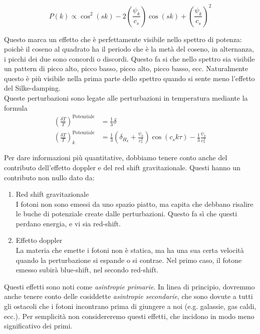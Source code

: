 \documentclass{report}
\begin{document}
\begin{equation}
    P(k) \propto \cos^2(sk) -2\left(\frac{\psi_k}{c_s}\right)\cos(sk) + \left(\frac{\psi_k}{c_s} \right)^2
\end{equation}

Questo marca un effetto che è perfettamente visibile nello spettro di potenza: poichè il coseno al quadrato ha il periodo che è la metà del coseno, in alternanza, i picchi dei due sono concordi o discordi. Questo fa si che nello spettro sia visibile un pattern di picco alto, picco basso, picco alto, picco basso, ecc. Naturalmente questo è più visibile nella prima parte dello spettro quando si sente meno l'effetto del Silke-damping. \\

Queste perturbazioni sono legate alle perturbazioni in temperatura mediante la formula 
\begin{align}
    \left(\frac{\delta T}{T}\right)^{\text{Potenziale}} &= \frac{1}{3}\delta \\
     \left(\frac{\delta T}{T} \right)^{\text{Potenziale}}_k&= \frac{1}{3}\left(\delta_{H_k}  + \frac{\psi_k}{c_s^2}\right)\cos{(c_sk\tau)} - \frac{1}{3}\frac{\psi_k}{c_s^2}
\end{align}

Per dare informazioni più quantitative, dobbiamo tenere conto anche del contributo dell'effetto doppler e del red shift gravitazionale. Questi hanno un contributo non nullo dato da:

\begin{enumerate}
    \item Red shift gravitazionale \\
    I fotoni non sono emessi da uno spazio piatto, ma capita che debbano risalire le buche di potenziale create dalle perturbazioni. Questo fa sì che questi perdano energia, e vi sia red-shift. 
    \item Effetto doppler \\
    La materia che emette i fotoni non è statica, ma ha una sua certa velocità quando la perturbazione si espande o si contrae. Nel primo caso, il fotone emesso subirà blue-shift, nel secondo red-shift. 
\end{enumerate}

Questi effetti sono noti come \emph{asintropie primarie}. In linea di principio,  dovremmo anche tenere conto delle cosiddette \emph{asintropie secondarie}, che sono dovute a tutti gli ostacoli che i fotoni incontrano prima di giungere a noi (e.g. galassie, gas caldi, ecc.). Per semplicità non considereremo questi effetti, che incidono in modo meno significativo dei primi.\\
\end{document}
